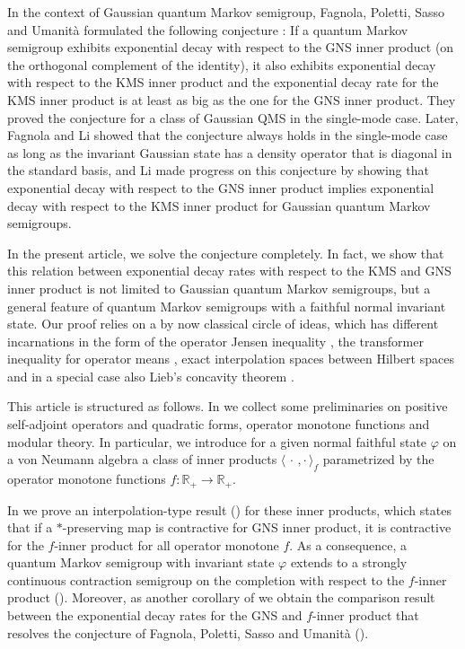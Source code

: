 \documentclass[a4paper,12pt]{amsart}
\renewcommand{\phi}{\varphi}
\newcommand{\IR}{\mathbb R}
\theoremstyle{plain}
\theoremstyle{remark}
\theoremstyle{definition}
\begin{document}
In the context of Gaussian quantum Markov semigroup, Fagnola, Poletti, Sasso and Umanità formulated the following conjecture \cite[Section 7]{FPSU25}: If a quantum Markov semigroup exhibits exponential decay with respect to the GNS inner product (on the orthogonal complement of the identity), it also exhibits exponential decay with respect to the KMS inner product and the exponential decay rate for the KMS inner product is at least as big as the one for the GNS inner product. They proved the conjecture for a class of Gaussian QMS in the single-mode case. Later, Fagnola and Li \cite{FL25} showed that the conjecture always holds in the single-mode case as long as the invariant Gaussian state has a density operator that is diagonal in the standard basis, and Li \cite{Li25} made progress on this conjecture by showing that exponential decay with respect to the GNS inner product implies exponential decay with respect to the KMS inner product for Gaussian quantum Markov semigroups.

In the present article, we solve the conjecture completely. In fact, we show that this relation between exponential decay rates with respect to the KMS and GNS inner product is not limited to Gaussian quantum Markov semigroups, but a general feature of quantum Markov semigroups with a faithful normal invariant state. Our proof relies on a by now classical circle of ideas, which has different incarnations in the form of the operator Jensen inequality \cite{HP82}, the transformer inequality for operator means \cite{KA80}, exact interpolation spaces between Hilbert spaces \cite{Don67} and in a special case also Lieb's concavity theorem \cite{Lie73}.

This article is structured as follows. In  we collect some preliminaries on positive self-adjoint operators and quadratic forms, operator monotone functions and modular theory. In particular, we introduce for a given normal faithful state $\phi$ on  a von Neumann algebra a class of inner products $\langle\,\cdot\,,\cdot\,\rangle_f$ parametrized by the operator monotone functions $f\colon\IR_+\to\IR_+$.

In  we prove an interpolation-type result () for these inner products, which states that if a $\ast$-preserving map is contractive for GNS inner product, it is contractive for the $f$-inner product for all operator monotone $f$. As a consequence, a quantum Markov semigroup with invariant state $\phi$ extends to a strongly continuous contraction semigroup on the completion with respect to the $f$-inner product (). Moreover, as another corollary of  we obtain the comparison result between the exponential decay rates for the GNS and $f$-inner product that resolves the conjecture of Fagnola, Poletti, Sasso and Umanità ().
\end{document}
